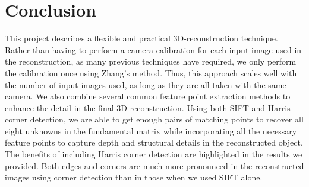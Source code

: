 \section{Conclusion}
\label{s:conclusion}

This project describes a flexible and practical 3D-reconstruction technique. Rather than having to perform a camera calibration for each input image used in the reconstruction, as many previous techniques have required, we only perform the calibration once using Zhang’s method. Thus, this approach scales well with the number of input images used, as long as they are all taken with the same camera. 
We also combine several common feature point extraction methods to enhance the detail in the final 3D reconstruction. Using both SIFT and Harris corner detection, we are able to get enough pairs of matching points to recover all eight unknowns in the fundamental matrix while incorporating all the necessary feature points to capture depth and structural details in the reconstructed object. The benefits of including Harris corner detection are highlighted in the results we provided. Both edges and corners are much more pronounced in the reconstructed images using corner detection than in those when we used SIFT alone. 

